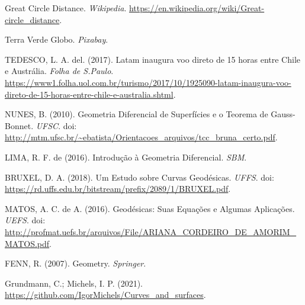\documentclass{article}
\begin{document}
\newpage
\begin{thebibliography}{9}

 Great Circle Distance. \textit{Wikipedia}. \url{https://en.wikipedia.org/wiki/Great-circle_distance}.

 Terra Verde Globo. \textit{Pixabay}.

 TEDESCO, L. A. del. (2017). Latam inaugura voo direto de 15 horas entre Chile e Austrália. \textit{Folha de S.Paulo}. \url{https://www1.folha.uol.com.br/turismo/2017/10/1925090-latam-inaugura-voo-direto-de-15-horas-entre-chile-e-australia.shtml}.

 NUNES, B. (2010). Geometria Diferencial de Superfícies e o Teorema de Gauss-Bonnet. \textit{UFSC}. doi: \url{http://mtm.ufsc.br/~ebatista/Orientacoes_arquivos/tcc_bruna_certo.pdf}.

 LIMA, R. F. de (2016). Introdução à Geometria Diferencial. \textit{SBM}.

 BRUXEL, D. A. (2018). Um Estudo sobre Curvas Geodésicas. \textit{UFFS}. doi: \url{https://rd.uffs.edu.br/bitstream/prefix/2089/1/BRUXEL.pdf}.

 MATOS, A. C. de A. (2016). Geodésicas: Suas Equações e Algumas Aplicações. \textit{UEFS}. doi: \url{http://profmat.uefs.br/arquivos/File/ARIANA_CORDEIRO_DE_AMORIM_MATOS.pdf}.

 FENN, R. (2007). Geometry. \textit{Springer}.

 Grundmann, C.; Michels, I. P. (2021). \url{https://github.com/IgorMichels/Curves_and_surfaces}.

\end{thebibliography}
\end{document}

